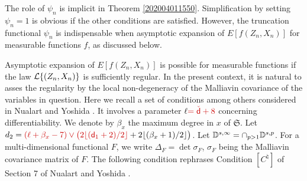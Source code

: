 \documentclass[a4paper,12pt]{article}
\numberwithin{equation}{section}
\numberwithin{equation}{section}
\newcommand{\sred}{\color[rgb]{0.8,0,0}}
\newcommand{\sred}{\color{black}}%
\def\sfd{{\sf d}}
\begin{document}
The role of $\psi_n$ is implicit in Theorem \ref{202004011550}. 
Simplification by setting $\psi_n=1$ is obvious if the other conditions are satisfied. 
However, the truncation functional $\psi_n$ is indispensable when 
asymptotic expansion of $E[f(Z_n,X_n)]$ for measurable functions $f$, as discussed below. 


Asymptotic expansion of $E[f(Z_n,X_n)]$ is possible for measurable functions 
if the law ${\cal L}\{(Z_n,X_n)\}$ is sufficiently regular. 
In the present context, it is natural to asses the regularity 
by the local non-degeneracy of the Malliavin covariance of the variables in question. 
Here we recall a set of conditions among others considered in 
Nualart and Yoshida \cite{nualart2019asymptotic}. 
It involves a parameter $\ell{\sred =\check{\sfd}+8}$ concerning differentiability. 
We denote by $\beta_x$ the maximum degree in $x$ of $\mathfrak{S}$. 
Let $d_2={\sred(\ell+\beta_x-7)\vee\big(2\lfloor(\sfd_1+2)/2\rfloor}
+2\lfloor(\beta_x+1)/2\rfloor\big)$. 
Let ${\mathbb D}^{s,\infty}=\cap_{p>1}{\mathbb D}^{s,p}$. 
For a multi-dimensional functional $F$, we write $\Delta_F=\det\sigma_{F}$, 
$\sigma_F$ being the Malliavin covariance matrix of $F$. 
The following condition rephrases Condition $[C^\natural]$ of Section 7 
of Nualart and Yoshida \cite{nualart2019asymptotic}. 
\end{document}
